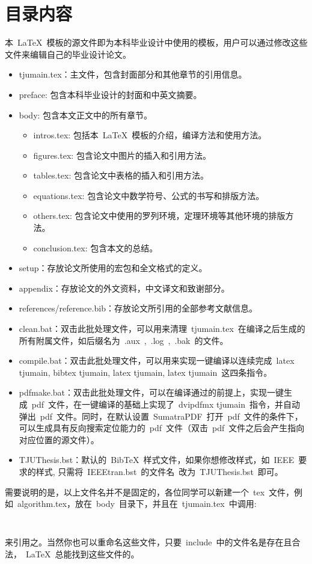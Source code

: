 \section{目录内容}
本~\LaTeX{}~模板的源文件即为本科毕业设计中使用的模板，用户可以通过修改这些文件来编辑自己的毕业设计论文。
\begin{itemize}
\item{tjumain.tex}：主文件，包含封面部分和其他章节的引用信息。
\item{preface}: 包含本科毕业设计的封面和中英文摘要。
\item{body}: 包含本文正文中的所有章节。
\begin{itemize}
\item{intros.tex}: 包括本~\LaTeX{}~模板的介绍，编译方法和使用方法。
\item{figures.tex}: 包含论文中图片的插入和引用方法。
\item{tables.tex}: 包含论文中表格的插入和引用方法。
\item{equations.tex}: 包含论文中数学符号、公式的书写和排版方法。
\item{others.tex}: 包含论文中使用的罗列环境，定理环境等其他环境的排版方法。
\item{conclusion.tex}: 包含本文的总结。
\end{itemize}
\item{setup}：存放论文所使用的宏包和全文格式的定义。
\item{appendix}：存放论文的外文资料，中文译文和致谢部分。
\item{references/reference.bib}：存放论文所引用的全部参考文献信息。
\item{clean.bat}：双击此批处理文件，可以用来清理~tjumain.tex~在编译之后生成的所有附属文件，如后缀名为~.aux~,~.log~,~.bak~的文件。
\item{compile.bat}：双击此批处理文件，可以用来实现一键编译以连续完成~latex tjumain, bibtex tjumain, latex tjumain, latex tjumain~这四条指令。
\item{pdfmake.bat}：双击此批处理文件，可以在编译通过的前提上，实现一键生成~pdf~文件，在一键编译的基础上实现了~dvipdfmx tjumain~指令，并自动弹出~pdf~文件。同时，在默认设置~SumatraPDF~打开~pdf~文件的条件下，可以生成具有反向搜索定位能力的~pdf~文件（双击~pdf~文件之后会产生指向对应位置的源文件）。
\item{TJUThesis.bst}：默认的~BibTeX~样式文件，如果你想修改样式，如~IEEE~要求的样式, 只需将~IEEEtran.bst~的文件名~改为~TJUThesis.bst~即可。
\end{itemize}


需要说明的是，以上文件名并不是固定的，各位同学可以新建一个~tex~文件，例如~algorithm.tex，放在~body~目录下，并且在~tjumain.tex~中调用:
\begin{verbatim}
    
\end{verbatim}
来引用之。当然你也可以重命名这些文件，只要~include~中的文件名是存在且合法，~\LaTeX~总能找到这些文件的。

